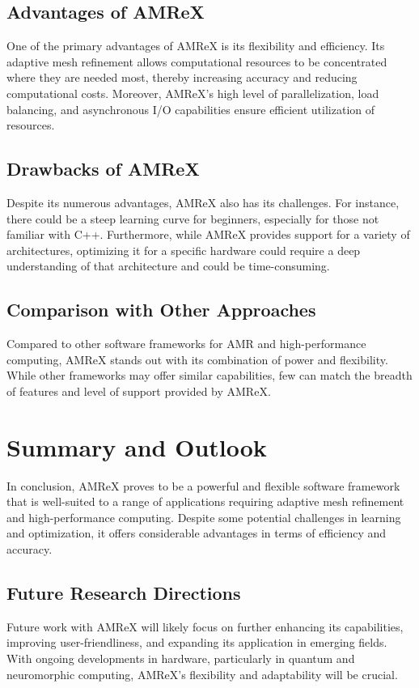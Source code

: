 \documentclass[12pt, a4paper]{scrartcl}
\begin{document}
\subsection{Advantages of AMReX}

One of the primary advantages of AMReX is its flexibility and efficiency. Its adaptive mesh 
refinement allows computational resources to be concentrated where they are needed most, thereby 
increasing accuracy and reducing computational costs. Moreover, AMReX's high level of 
parallelization, load balancing, and asynchronous I/O capabilities ensure efficient 
utilization of resources.

\subsection{Drawbacks of AMReX}

Despite its numerous advantages, AMReX also has its challenges. For instance, there 
could be a steep learning curve for beginners, especially for those not familiar 
with C++. Furthermore, while AMReX provides support for a variety of architectures, optimizing 
it for a specific hardware could require a deep understanding of that architecture and 
could be time-consuming.

\subsection{Comparison with Other Approaches}

Compared to other software frameworks for AMR and high-performance computing, AMReX 
stands out with its combination of power and flexibility. While other frameworks 
may offer similar capabilities, few can match the breadth of features and level 
of support provided by AMReX.

\section{Summary and Outlook}

In conclusion, AMReX proves to be a powerful and flexible software framework that 
is well-suited to a range of applications requiring adaptive mesh refinement and 
high-performance computing. Despite some potential challenges in learning and 
optimization, it offers considerable advantages in terms of efficiency and accuracy.

\subsection{Future Research Directions}

Future work with AMReX will likely focus on further enhancing its capabilities, improving 
user-friendliness, and expanding its application in emerging fields. With ongoing developments 
in hardware, particularly in quantum and neuromorphic computing, AMReX's flexibility and 
adaptability will be crucial.
\end{document}
